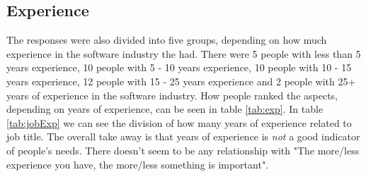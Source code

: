 \documentclass{cslthse-msc}
\begin{document}
    \subsection{Experience}
    The responses were also divided into five groups, depending on how much
    experience in the software industry the had. There were 5 people with
    less than 5 years experience, 10 people with 5 - 10 years experience, 10
    people with 10 - 15 years experience, 12 people with 15 - 25 years
    experience and 2 people with 25+ years of experience in the software
    industry. How people ranked the aspects, depending on years of experience, can be seen in table \ref{tab:exp}. In table \ref{tab:jobExp} we can see the division of how many years of experience related to job title.
    The overall take away is that years of experience is \textit{not} a good indicator of people's needs. There doesn't seem to be any relationship with "The more/less experience you have, the more/less something is important".
\end{document}
